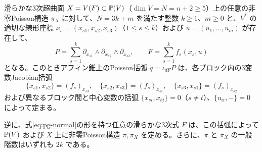 \begin{theorem}\label{thm:pg-normal}\label{pthm:normal-form}
滑らかな3次超曲面 $X=V(F)\subset\mathbb P(V)$（$\dim V=N=n+2\ge5$）上の任意の非零Poisson構造 $\pi_X$ に対して、$N=3k+m$ を満たす整数 $k\ge1$、$m\ge0$ と、$V^*$ の適切な線形座標 $x_s=(x_{s1},x_{s2},x_{s3})$（$1\le s\le k$）および $u=(u_1,\ldots,u_m)$ が存在して、
\begin{equation}
P=\sum_{s=1}^k\partial_{x_{s1}}\wedge\partial_{x_{s2}}\wedge\partial_{x_{s3}},
\qquad F=\sum_{s=1}^k f_s(x_s,u)\label{eq:pg-normal}
\end{equation}
となる。このときアフィン錐上のPoisson括弧 $q=\iota_{dF}P$ は、各ブロック内の3変数Jacobian括弧
\begin{equation}
\{x_{s1},x_{s2}\}=(f_s)_{x_{s3}},\quad
\{x_{s2},x_{s3}\}=(f_s)_{x_{s1}},\quad
\{x_{s3},x_{s1}\}=(f_s)_{x_{s2}}\label{eq:pg-bracket}
\end{equation}
および異なるブロック間と中心変数の括弧 $\{x_{si},x_{tj}\}=0$（$s\ne t$）、$\{u_\alpha,-\}=0$ によって定まる。

逆に、式\eqref{eq:pg-normal}の形を持つ任意の滑らかな3次式 $F$ は、この括弧によって $\mathbb P(V)$ および $X$ 上に非零Poisson構造 $\pi,\pi_X$ を定める。さらに、$\pi$ と $\pi_X$ の一般階数はいずれも $2k$ である。
\end{theorem}
